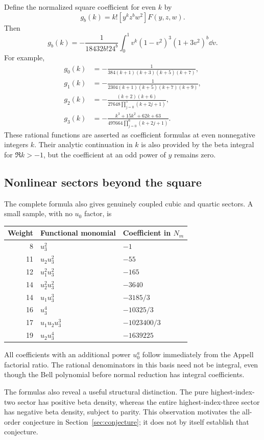 Define the normalized square coefficient for even $k$ by
\[
 g_b(k)=k![y^kz^bw^2]F(y,z,w).
\]
Then
\begin{equation}\label{eq:gb-density}
 g_b(k)=-\frac1{18432b!24^b}
 \int_0^1v^k(1-v^2)^3(1+3v^2)^b\dd v.
\end{equation}
For example,
\begin{align}
 g_0(k)&=-\frac1{384(k+1)(k+3)(k+5)(k+7)},\label{eq:g0}\\
 g_1(k)&=-\frac1{2304(k+1)(k+5)(k+7)(k+9)},\label{eq:g1}\\
 g_2(k)&=-\frac{(k+2)(k+6)}{27648\prod_{j=0}^5(k+2j+1)},\label{eq:g2}\\
 g_3(k)&=-\frac{k^3+15k^2+62k+63}{497664\prod_{j=0}^6(k+2j+1)}.
 \label{eq:g3}
\end{align}
These rational functions are asserted as coefficient formulas at even
nonnegative integers $k$. Their analytic continuation in $k$ is also
provided by the beta integral for $\Re k>-1$, but the coefficient at an
odd power of $y$ remains zero.

\subsection{Nonlinear sectors beyond the square}
The complete formula also gives genuinely coupled cubic and quartic
sectors. A small sample, with no $u_0$ factor, is
\begin{center}
\begin{tabular}{rll}
\toprule
Weight & Functional monomial & Coefficient in $N_m$\\
\midrule
8 & $u_3^2$ & $-1$\\
11 & $u_2u_3^2$ & $-55$\\
12 & $u_1^2u_3^2$ & $-165$\\
14 & $u_2^2u_3^2$ & $-3640$\\
14 & $u_1u_3^3$ & $-3185/3$\\
16 & $u_3^4$ & $-10325/3$\\
17 & $u_1u_2u_3^3$ & $-1023400/3$\\
19 & $u_2u_3^4$ & $-1639225$\\
\bottomrule
\end{tabular}
\end{center}
All coefficients with an additional power $u_0^a$ follow immediately
from the Appell factorial ratio. The rational denominators in this
basis need not be integral, even though the Bell polynomial before
normal reduction has integral coefficients.

The formulas also reveal a useful structural distinction. The pure
highest-index-two sector has positive beta density, whereas the entire
highest-index-three sector has negative beta density, subject to parity.
This observation motivates the all-order conjecture in
Section~\ref{sec:conjecture}; it does not by itself establish that
conjecture.

